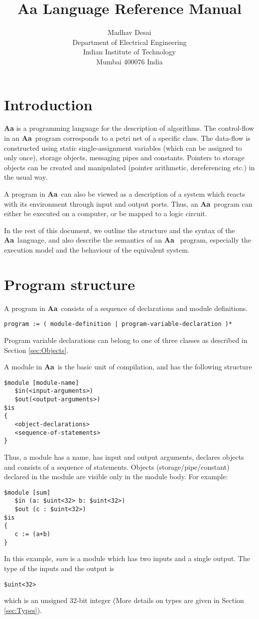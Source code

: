 \documentclass{article}
\title{Aa Language Reference Manual}
\author{Madhav Desai \\ Department of Electrical Engineering \\ Indian Institute of Technology \\
	Mumbai 400076 India}
\newcommand{\Aa}{{\bf Aa}~}
\begin{document}
\maketitle

\section{Introduction}

{\bf Aa} is a programming language for the 
description of algorithms.   The control-flow
in an \Aa program corresponds to a petri net
of a specific class.
The data-flow is constructed using static
single-assignment variables (which can be assigned to only once),
storage objects, messaging pipes and constants.
Pointers to storage objects can be created
and manipulated (pointer arithmetic, dereferencing
etc.) in the usual way.  

A program in \Aa can also be viewed as a 
description of a system which reacts with 
its environment through input and output ports.
Thus, an \Aa program can either be executed on a 
computer, or be mapped to a logic circuit.

In the rest of this document, we outline the
structure and the syntax of the \Aa language,
and also describe the semantics of an \Aa
program, especially the execution model and
the behaviour of the equivalent system.


\section{Program structure}


A program in \Aa consists of a sequence of
declarations and module definitions.  
\begin{verbatim}
program := ( module-definition | program-variable-declaration )*
\end{verbatim}
Program variable declarations
can belong to one of three classes as described in Section \ref{sec:Objects}.

A module in \Aa is the basic unit of compilation, and
has the following structure
\begin{verbatim}
$module [module-name] 
   $in(<input-arguments>)
   $out(<output-arguments>)
$is
{
   <object-declarations>
   <sequence-of-statements>
}
\end{verbatim}
Thus, a module has a name, has input and output arguments,
declares objects and consists of a sequence of statements.
Objects (storage/pipe/constant) declared in the module are visible only in the
module body.   For example:
\begin{verbatim}
$module [sum] 
   $in (a: $uint<32> b: $uint<32>) 
   $out (c : $uint<32>)
$is
{
   c := (a+b)
}
\end{verbatim}
In this example, {\em sum} is 
a module which has two inputs and a single output.
The type of the inputs and the output is 
\begin{verbatim}
$uint<32>
\end{verbatim}
which is an unsigned 32-bit integer (More details
on types are given in Section \ref{sec:Types}).
\end{document}

